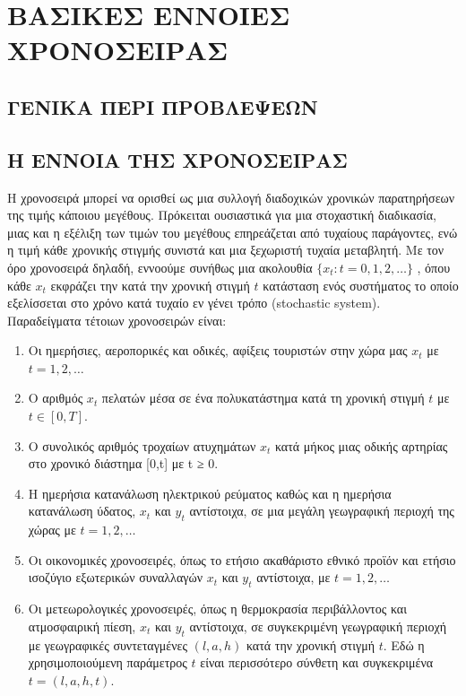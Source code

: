 
\chapter{ΒΑΣΙΚΕΣ ΕΝΝΟΙΕΣ ΧΡΟΝΟΣΕΙΡΑΣ}
\section{ΓΕΝΙΚΑ ΠΕΡΙ ΠΡΟΒΛΕΨΕΩΝ}

\section{Η ΕΝΝΟΙΑ ΤΗΣ ΧΡΟΝΟΣΕΙΡΑΣ}
 Η χρονοσειρά μπορεί να ορισθεί ως μια συλλογή διαδοχικών χρονικών
παρατηρήσεων της τιμής κάποιου μεγέθους. Πρόκειται ουσιαστικά για μια στοχαστική
διαδικασία, μιας και η εξέλιξη των τιμών του μεγέθους επηρεάζεται από τυχαίους
παράγοντες, ενώ η τιμή κάθε χρονικής στιγμής συνιστά και μια ξεχωριστή τυχαία
μεταβλητή. Με τον όρο χρονοσειρά δηλαδή, εννοούμε συνήθως μια ακολουθία $\{ x_t : t = 0,1,2,\ldots \}$ , όπου
κάθε $ x_t $ εκφράζει την κατά την χρονική στιγμή $ t $ κατάσταση ενός συστήματος το
οποίο εξελίσσεται στο χρόνο κατά τυχαίο εν γένει τρόπο (stochastic system).\\ 
Παραδείγματα τέτοιων χρονοσειρών είναι: \\
\begin{enumerate}


\item Οι ημερήσιες, αεροπορικές και οδικές, αφίξεις τουριστών στην χώρα μας $ x_t $ με
$t = 1, 2,\ldots $
\item Ο αριθμός $ x_t $ πελατών μέσα σε ένα πολυκατάστημα κατά τη χρονική στιγμή
$ t $ με $ t \in [0, T ] $.
\item Ο συνολικός αριθμός τροχαίων ατυχημάτων $ x_t $ κατά μήκος μιας οδικής
αρτηρίας στο χρονικό διάστημα [0,t] με t ≥ 0.
\item Η ημερήσια κατανάλωση ηλεκτρικού ρεύματος καθώς και η ημερήσια
κατανάλωση ύδατος, $ x_t $ και $ y_t $ αντίστοιχα, σε μια μεγάλη γεωγραφική περιοχή
της χώρας με $ t = 1, 2,\ldots $

\item Οι οικονομικές χρονοσειρές, όπως το ετήσιο ακαθάριστο εθνικό προϊόν και
ετήσιο ισοζύγιο εξωτερικών συναλλαγών $ x_t $ και $ y_t $ αντίστοιχα, με $ t = 1, 2,\ldots $
\item Οι μετεωρολογικές χρονοσειρές, όπως η θερμοκρασία περιβάλλοντος και
ατμοσφαιρική πίεση, $ x_t $ και $ y_t $ αντίστοιχα, σε συγκεκριμένη γεωγραφική
περιοχή με γεωγραφικές συντεταγμένες $ \left(l, a, h \right) $ κατά την χρονική στιγμή $ t $.
Εδώ η χρησιμοποιούμενη παράμετρος $ t $ είναι περισσότερο σύνθετη και
συγκεκριμένα $ t = \left( l,a,h ,t \right) $.
\end{enumerate}

